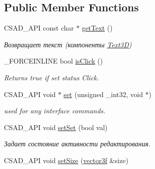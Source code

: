 \subsection*{Public Member Functions}
\begin{DoxyCompactItemize}
\item 
\hypertarget{classcsad_1_1_s_g_line_edit_a5a126be9c8b4af7538083362b0b58bdc}{C\-S\-A\-D\-\_\-\-A\-P\-I const char $\ast$ \hyperlink{classcsad_1_1_s_g_line_edit_a5a126be9c8b4af7538083362b0b58bdc}{get\-Text} ()}\label{classcsad_1_1_s_g_line_edit_a5a126be9c8b4af7538083362b0b58bdc}

\begin{DoxyCompactList}\small\item\em Возвращает текст (компоненты \hyperlink{classcsad_1_1_text3_d}{Text3\-D}) \end{DoxyCompactList}\item 
\hypertarget{classcsad_1_1_s_g_line_edit_a3cad93aa55612bc9d172465a8679d438}{\-\_\-\-F\-O\-R\-C\-E\-I\-N\-L\-I\-N\-E bool \hyperlink{classcsad_1_1_s_g_line_edit_a3cad93aa55612bc9d172465a8679d438}{is\-Click} ()}\label{classcsad_1_1_s_g_line_edit_a3cad93aa55612bc9d172465a8679d438}

\begin{DoxyCompactList}\small\item\em Returns true if set status Click. \end{DoxyCompactList}\item 
\hypertarget{classcsad_1_1_s_g_line_edit_a2c05a328fa166bdceacd46373993b185}{C\-S\-A\-D\-\_\-\-A\-P\-I void $\ast$ \hyperlink{classcsad_1_1_s_g_line_edit_a2c05a328fa166bdceacd46373993b185}{set} (unsigned \-\_\-int32, void $\ast$)}\label{classcsad_1_1_s_g_line_edit_a2c05a328fa166bdceacd46373993b185}

\begin{DoxyCompactList}\small\item\em used for any interface commands. \end{DoxyCompactList}\item 
\hypertarget{classcsad_1_1_s_g_line_edit_af31c5cc0e43a2822c1c7d14acbea3e51}{C\-S\-A\-D\-\_\-\-A\-P\-I void \hyperlink{classcsad_1_1_s_g_line_edit_af31c5cc0e43a2822c1c7d14acbea3e51}{set\-Set} (bool val)}\label{classcsad_1_1_s_g_line_edit_af31c5cc0e43a2822c1c7d14acbea3e51}

\begin{DoxyCompactList}\small\item\em Задает состояние активности редактирования. \end{DoxyCompactList}\item 
\hypertarget{classcsad_1_1_s_g_line_edit_a0e1e5c352a91c39448727727fe3a9b33}{C\-S\-A\-D\-\_\-\-A\-P\-I void \hyperlink{classcsad_1_1_s_g_line_edit_a0e1e5c352a91c39448727727fe3a9b33}{set\-Size} (\hyperlink{classbt_1_1vector3f}{vector3f} \&size)}\label{classcsad_1_1_s_g_line_edit_a0e1e5c352a91c39448727727fe3a9b33}


\end{DoxyCompactItemize}
